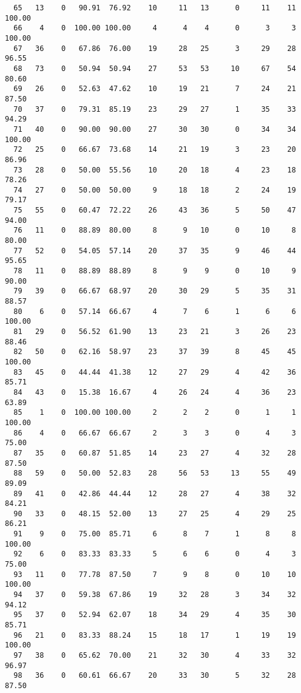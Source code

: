 \begin{verbatim}
  65   13    0   90.91  76.92    10     11   13      0     11    11   100.00
  66    4    0  100.00 100.00     4      4    4      0      3     3   100.00
  67   36    0   67.86  76.00    19     28   25      3     29    28    96.55
  68   73    0   50.94  50.94    27     53   53     10     67    54    80.60
  69   26    0   52.63  47.62    10     19   21      7     24    21    87.50
  70   37    0   79.31  85.19    23     29   27      1     35    33    94.29
  71   40    0   90.00  90.00    27     30   30      0     34    34   100.00
  72   25    0   66.67  73.68    14     21   19      3     23    20    86.96
  73   28    0   50.00  55.56    10     20   18      4     23    18    78.26
  74   27    0   50.00  50.00     9     18   18      2     24    19    79.17
  75   55    0   60.47  72.22    26     43   36      5     50    47    94.00
  76   11    0   88.89  80.00     8      9   10      0     10     8    80.00
  77   52    0   54.05  57.14    20     37   35      9     46    44    95.65
  78   11    0   88.89  88.89     8      9    9      0     10     9    90.00
  79   39    0   66.67  68.97    20     30   29      5     35    31    88.57
  80    6    0   57.14  66.67     4      7    6      1      6     6   100.00
  81   29    0   56.52  61.90    13     23   21      3     26    23    88.46
  82   50    0   62.16  58.97    23     37   39      8     45    45   100.00
  83   45    0   44.44  41.38    12     27   29      4     42    36    85.71
  84   43    0   15.38  16.67     4     26   24      4     36    23    63.89
  85    1    0  100.00 100.00     2      2    2      0      1     1   100.00
  86    4    0   66.67  66.67     2      3    3      0      4     3    75.00
  87   35    0   60.87  51.85    14     23   27      4     32    28    87.50
  88   59    0   50.00  52.83    28     56   53     13     55    49    89.09
  89   41    0   42.86  44.44    12     28   27      4     38    32    84.21
  90   33    0   48.15  52.00    13     27   25      4     29    25    86.21
  91    9    0   75.00  85.71     6      8    7      1      8     8   100.00
  92    6    0   83.33  83.33     5      6    6      0      4     3    75.00
  93   11    0   77.78  87.50     7      9    8      0     10    10   100.00
  94   37    0   59.38  67.86    19     32   28      3     34    32    94.12
  95   37    0   52.94  62.07    18     34   29      4     35    30    85.71
  96   21    0   83.33  88.24    15     18   17      1     19    19   100.00
  97   38    0   65.62  70.00    21     32   30      4     33    32    96.97
  98   36    0   60.61  66.67    20     33   30      5     32    28    87.50

\end{verbatim}
